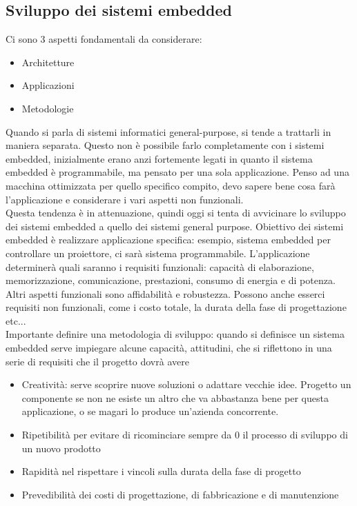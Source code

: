 \documentclass[12pt, oneside]{extbook}
\begin{document}
\subsection{Sviluppo dei sistemi embedded}
Ci sono 3 aspetti fondamentali da considerare:
\begin{itemize}
\item Architetture
\item Applicazioni
\item Metodologie
\end{itemize}
Quando si parla di sistemi informatici general-purpose, si tende a trattarli in maniera separata. Questo non è possibile farlo completamente con i sistemi embedded, inizialmente erano anzi fortemente legati in quanto il sistema embedded è programmabile, ma pensato per una sola applicazione. Penso ad una macchina ottimizzata per quello specifico compito, devo sapere bene cosa farà l'applicazione e considerare i vari aspetti non funzionali.\\ Questa tendenza è in attenuazione, quindi oggi si tenta di avvicinare lo sviluppo dei sistemi embedded a quello dei sistemi general purpose. Obiettivo dei sistemi embedded è realizzare applicazione specifica: esempio, sistema embedded per controllare un proiettore, ci sarà sistema programmabile. L'applicazione determinerà quali saranno i requisiti funzionali: capacità di elaborazione, memorizzazione, comunicazione, prestazioni, consumo di energia e di potenza. Altri aspetti funzionali sono affidabilità e robustezza. Possono anche esserci requisiti non funzionali, come i costo totale, la durata della fase di progettazione etc...\\ Importante definire una metodologia di sviluppo: quando si definisce un sistema embedded serve impiegare alcune capacità, attitudini, che si riflettono in una serie di requisiti che il progetto dovrà avere
\begin{itemize}
\item Creatività: serve scoprire nuove soluzioni o adattare vecchie idee. Progetto un componente se non ne esiste un altro che va abbastanza bene per questa applicazione, o se magari lo produce un'azienda concorrente.
\item Ripetibilità per evitare di ricominciare sempre da 0 il processo di sviluppo di un nuovo prodotto
\item Rapidità nel rispettare i vincoli sulla durata della fase di progetto
\item Prevedibilità dei costi di progettazione, di fabbricazione e di manutenzione
\end{itemize}
\end{document}
